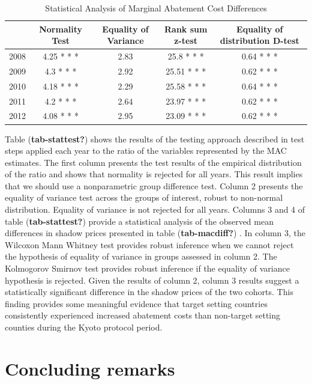 \documentclass[
  letterpaper,
  DIV=11,
  numbers=noendperiod]{scrartcl}
\begin{document}
\begin{table}

\caption{Statistical Analysis of Marginal Abatement Cost Differences}
\centering
\begin{tabular}[t]{l|c|c|c|c}
\hline
  & Normality Test & Equality of Variance & Rank sum z-test & Equality of distribution D-test\\
\hline
2008 & 4.25 * * * & 2.83 & 25.8 * * * & 0.64 * * *\\
\hline
2009 & 4.3 * * * & 2.92 & 25.51 * * * & 0.62 * * *\\
\hline
2010 & 4.18 * * * & 2.29 & 25.58 * * * & 0.64 * * *\\
\hline
2011 & 4.2 * * * & 2.64 & 23.97 * * * & 0.62 * * *\\
\hline
2012 & 4.08 * * * & 2.95 & 23.09 * * * & 0.62 * * *\\
\hline
\end{tabular}
\end{table}

Table (\textbf{tab-stattest?}) shows the results of the testing approach
described in test steps applied each year to the ratio of the variables
represented by the MAC estimates. The first column presents the test
results of the empirical distribution of the ratio and shows that
normality is rejected for all years. This result implies that we should
use a nonparametric group difference test. Column 2 presents the
equality of variance test across the groups of interest, robust to
non-normal distribution. Equality of variance is not rejected for all
years. Columns 3 and 4 of table (\textbf{tab-stattest?}) provide a
statistical analysis of the observed mean differences in shadow prices
presented in table (\textbf{tab-macdiff?}) . In column 3, the Wilcoxon
Mann Whitney test provides robust inference when we cannot reject the
hypothesis of equality of variance in groups assessed in column 2. The
Kolmogorov Smirnov test provides robust inference if the equality of
variance hypothesis is rejected. Given the results of column 2, column 3
results suggest a statistically significant difference in the shadow
prices of the two cohorts. This finding provides some meaningful
evidence that target setting countries consistently experienced
increased abatement costs than non-target setting counties during the
Kyoto protocol period.

\hypertarget{concluding-remarks}{%
\section{Concluding remarks}\label{concluding-remarks}}
\end{document}

